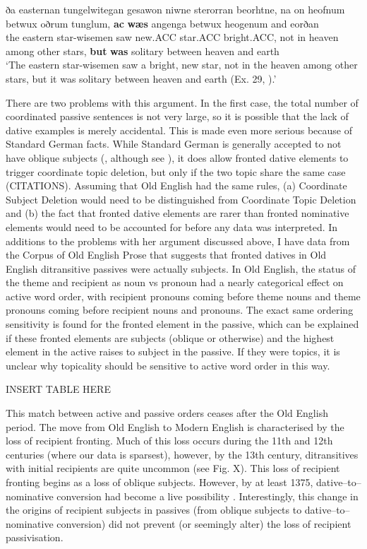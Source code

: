 	\begin{exe}
		\ex \label{ex:OECSD} \gll ða easternan tungelwitegan gesawon niwne sterorran beorhtne, na on heofnum betwux oðrum tunglum, \textbf{ac} \textbf{w\ae s} angenga betwux heogenum and eorðan\\
		the eastern star-wisemen saw new.ACC star.ACC bright.ACC, not in heaven among other stars, \textbf{but} \textbf{was} solitary between heaven and earth\\
		\trans `The eastern star-wisemen saw a bright, new star, not in the heaven among other stars, but it was solitary between heaven and earth (Ex. 29, \citealt{Allen.1999}).'
	\end{exe}

	There are two problems with this argument. In the first case, the total number of coordinated passive sentences is not very large, so it is possible that the lack of dative examples is merely accidental. This is made even more serious because of Standard German facts. While Standard German is generally accepted to not have oblique subjects (\citealt{Zaenen.1985}, although see \citealt{Eythorsson.2005}), it does allow fronted dative elements to trigger coordinate topic deletion, but only if the two topic share the same case (CITATIONS). Assuming that Old English had the same rules, (a) Coordinate Subject Deletion would need to be distinguished from Coordinate Topic Deletion and (b) the fact that fronted dative elements are rarer than fronted nominative elements would need to be accounted for before any data was interpreted. 
	In additions to the problems with her argument discussed above, I have data from the Corpus of Old English Prose \citep{Taylor.2003} that suggests that fronted datives in Old English ditransitive passives were actually subjects. In Old English, the status of the theme and recipient as noun vs pronoun had a nearly categorical effect on active word order, with recipient pronouns coming before theme nouns and theme pronouns coming before recipient nouns and pronouns. The exact same ordering sensitivity is found for the fronted element in the passive, which can be explained if these fronted elements are subjects (oblique or otherwise) and the highest element in the active raises to subject in the passive. If they were topics, it is unclear why topicality should be sensitive to active word order in this way.

	INSERT TABLE HERE
	
	This match between active and passive orders ceases after the Old English period. The move from Old English to Modern English is characterised by the loss of recipient fronting. Much of this loss occurs during the 11th and 12th centuries (where our data is sparsest), however, by the 13th century, ditransitives with initial recipients are quite uncommon (see Fig. X). This loss of recipient fronting begins as a loss of oblique subjects. However, by at least 1375, dative--to--nominative conversion had become a live possibility \citep{Allen.1999}. Interestingly, this change in the origins of recipient subjects in passives (from oblique subjects to dative--to--nominative conversion) did not prevent (or seemingly alter) the loss of recipient passivisation.

